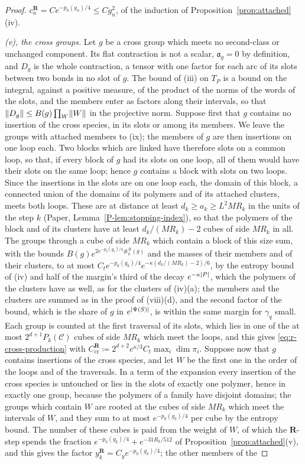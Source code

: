 \documentclass[11pt]{preprint}
\DeclarePairedDelimiter{\abs}{\lvert}{\rvert}
\DeclarePairedDelimiter{\norm}{\lVert}{\rVert}
\numberwithin{equation}{section}
\theoremstyle{definition}
\theoremstyle{remark}
\theoremstyle{plain}
\begin{document}
\begin{proof}
$c^{\mathbf R}_n = Ce^{-p_0(g_n)/4} \leq Cg_n^2$, of the induction of Proposition~\ref{prop:attached}(iv). 

\emph{(v), the cross groups.} Let $g$ be a cross group which meets no second-class or unchanged component. Its flat contraction is not a scalar, $\mathfrak a_g = 0$ by definition, and $D_g$ is the whole contraction, a tensor with one factor for each arc of its slots between two bonds in no slot of $g$. The bound of (iii) on $T_P$ is a bound on the integral, against a positive measure, of the product of the norms of the words of the slots, and the members enter as factors along their intervals, so that $\norm{D_g} \leq B(g)\prod_W\norm W$ in the projective norm. Suppose first that $g$ contains no insertion of the cross species, in its slots or among its members. We leave the groups with attached members to (ix); the members of $g$ are then insertions on one loop each. Two blocks which are linked have therefore slots on a common loop, so that, if every block of $g$ had its slots on one loop, all of them would have their slots on the same loop; hence $g$ contains a block with slots on two loops. Since the insertions in the slots are on one loop each, the domain of this block, a connected union of the domains of its polymers and of its attached clusters, meets both loops. These are at distance at least $d_k \geq a_k \geq L^2MR_k$ in the units of the step $k$ (Paper, Lemma~\ref{P-lem:stopping-index}), so that the polymers of the block and of its clusters have at least $d_k/(MR_k) - 2$ cubes of side $MR_k$ in all. The groups through a cube of side $MR_k$ which contain a block of this size sum, with the bounds $B(g)e^{2e^{-p_0(g_k)/4}\#^R_k(g)}$ and the masses of their members and of their clusters, to at most $C_te^{-p_0(g_k)/4}e^{-\kappa(d_k/(MR_k) - 2)/6}$, by the entropy bound of (iv) and half of the margin's third of the decay $e^{-\kappa\abs P}$, which the polymers of the clusters have as well, as for the clusters of (iv)(a); the members and the clusters are summed as in the proof of (viii)(d), and the second factor of the bound, which is the share of $g$ in $e^{\abs{\Psi(S)}}$, is within the same margin for $\gamma_q$ small. Each group is counted at the first traversal of its slots, which lies in one of the at most $2^{d+1}P_k(\mathcal C)$ cubes of side $MR_k$ which meet the loops, and this gives \eqref{eq:r-cross-production} with $C^{\mathbf R}_{\mathrm{cr}} \coloneqq 2^{d+2}e^{\kappa/3}C_t\max_i\dim\pi_i$. Suppose now that $g$ contains insertions of the cross species, and let $W$ be the first one in the order of the loops and of the traversals. In a term of the expansion every insertion of the cross species is untouched or lies in the slots of exactly one polymer, hence in exactly one group, because the polymers of a family have disjoint domains; the groups which contain $W$ are rooted at the cubes of side $MR_k$ which meet the intervals of $W$, and they sum to at most $e^{-p_0(g_k)/4}$ per cube by the entropy bound. The number of these cubes is paid from the weight of $W$, of which the $\mathbf R$-step spends the fraction $e^{-p_0(g_k)/4} + e^{-31R_k/512}$ of Proposition~\ref{prop:attached}(v), and this gives the factor $y^{\mathbf R}_k = C_ye^{-p_0(g_k)/4}$; the other members of the 
\end{proof}
\end{document}
